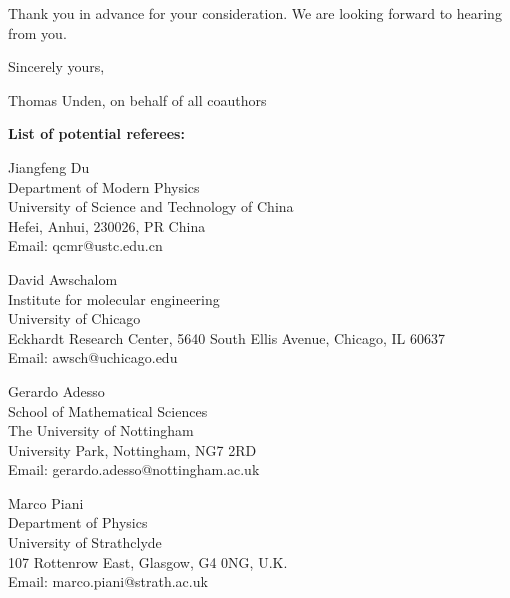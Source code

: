 \documentclass[10pt,a4paper,roman]{moderncv}        %
\begin{document}
Thank you in advance for your consideration. We are looking forward to hearing from you.  
\bigskip

Sincerely yours,\bigskip

Thomas Unden, on behalf of all coauthors


\clearpage
\textbf{List of potential referees:}\bigskip


Jiangfeng Du\\
Department of Modern Physics\\
University of Science and Technology of China\\
Hefei, Anhui, 230026, PR China\\
Email: qcmr@ustc.edu.cn\bigskip


David Awschalom\\
Institute for molecular engineering\\
University of Chicago\\
Eckhardt Research Center, 5640 South Ellis Avenue, Chicago, IL 60637\\
Email: awsch@uchicago.edu\bigskip


Gerardo Adesso\\
School of Mathematical Sciences\\
The University of Nottingham\\
University Park, Nottingham, NG7 2RD \\
Email: gerardo.adesso@nottingham.ac.uk\bigskip

Marco Piani\\
Department of Physics\\
University of Strathclyde\\
107 Rottenrow East, Glasgow, G4 0NG, U.K. \\
Email: marco.piani@strath.ac.uk\\

\end{document}

